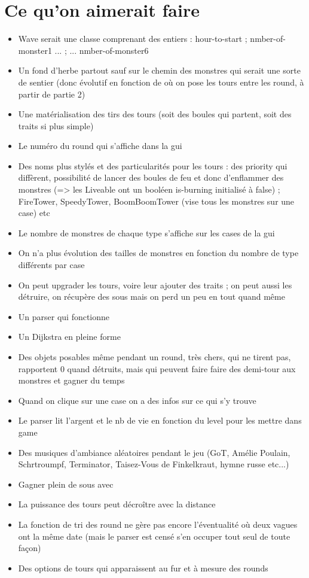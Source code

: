 \documentclass{article}
\begin{document}
\section{Ce qu'on aimerait faire}
\begin{itemize}
\item Wave serait une classe comprenant des entiers : hour-to-start ; nmber-of-monster1 ... ; ... nmber-of-monster6
\item Un fond d'herbe partout sauf sur le chemin des monstres qui serait une sorte de sentier (donc évolutif en fonction de où on pose les tours entre les round, à partir de partie 2)
\item Une matérialisation des tirs des tours (soit des boules qui partent, soit des traits si plus simple)
\item Le numéro du round qui s'affiche dans la gui
\item Des noms plus stylés et des particularités pour les tours : des priority qui diffèrent, possibilité de lancer des boules de feu et donc d'enflammer des monstres (=> les Liveable ont un booléen is-burning initialisé à false) ; FireTower, SpeedyTower, BoomBoomTower (vise tous les monstres sur une case) etc
\item Le nombre de monstres de chaque type s'affiche sur les cases de la gui
\item On n'a plus évolution des tailles de monstres en fonction du nombre de type différents par case
\item On peut upgrader les tours, voire leur ajouter des traits ; on peut aussi les détruire, on récupère des sous mais on perd un peu en tout quand même
\item Un parser qui fonctionne
\item Un Dijkstra en pleine forme
\item Des objets posables même pendant un round, très chers, qui ne tirent pas, rapportent 0 quand détruits, mais qui peuvent faire faire des demi-tour aux monstres et gagner du temps
\item Quand on clique sur une case on a des infos sur ce qui s'y trouve
\item Le parser lit l'argent et le nb de vie en fonction du level pour les mettre dans game
\item Des musiques d'ambiance aléatoires pendant le jeu (GoT, Amélie Poulain, Schrtroumpf, Terminator, Taisez-Vous de Finkelkraut, hymne russe etc...)
\item Gagner plein de sous avec
\item La puissance des tours peut décroître avec la distance
\item La fonction de tri des round ne gère pas encore l'éventualité où deux vagues ont la même date (mais le parser est censé s'en occuper tout seul de toute façon)
\item Des options de tours qui apparaissent au fur et à mesure des rounds

\end{itemize}
\end{document}
